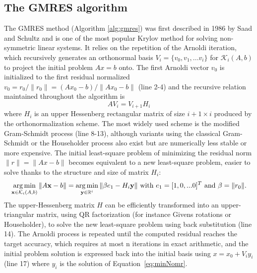 \subsection{The GMRES algorithm}
The GMRES method (Algorithm \ref{alg:gmres}) was first described in 1986 by Saad and Schultz \cite{gmres} and is one of the most popular Krylov method for solving non-symmetric linear systems. It relies on the repetition of the Arnoldi iteration, which recursively generates an orthonormal basis $V_i = \{v_0, v_1, ... v_{i}\}$ for $\mathcal{K}_i(A, b)$ to project the initial problem $A x = b$ onto. The first Arnoldi vector $v_0$ is initialized to the first residual normalized $v_0 = r_0/\|r_0\| = (A x_0 - b) / \|A x_0 - b\|$ (line 2-4) and the recursive relation maintained throughout the algorithm is $$AV_i = V_{i+1}H_i$$ where $H_i$ is an upper Hessenberg rectangular matrix of size $i+1 \times i$ produced by the orthonormalization scheme. The most widely used scheme is the modified Gram-Schmidt process (line 8-13), although variants using the classical Gram-Schmidt or the Householder process also exist but are numerically less stable or more expensive. The initial least-square problem of minimizing the residual norm $\|r\| = \|A x  - b\|$ becomes equivalent to a new least-square problem, easier to solve thanks to the structure and size of matrix $H_i$:
\begin{equation}\label{eq:minNomr}
\operatorname*{arg\,min}_{\mathbf{x} \in \mathcal{K}_i(A, b)} \|A \mathbf{x} - b\| = \operatorname*{arg\,min}_{\mathbf{y}\in \Bbb{R}^i}\|\beta e_1 - H_{i} \mathbf{y}\| \text{ with } e_1 = [1, 0,...0]^T \text{ and } \beta = \|r_0\| \text{.}
\end{equation}
The upper-Hessenberg matrix $H$ can be efficiently transformed into an upper-triangular matrix, using QR factorization (for instance Givens rotations or Householder), to solve the new least-square problem using back substitution \cite{govl:96} (line 14). The Arnoldi process is repeated until the computed residual reaches the target accuracy, which requires at most n iterations in exact arithmetic, and the initial problem solution is expressed back into the initial basis using $x = x_0 + V_i y_i$ (line 17) where $y_i$ is the solution of Equation~\eqref{eq:minNomr}.

